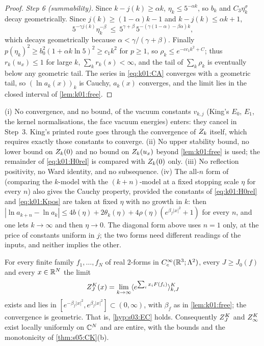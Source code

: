 \begin{proof}
\emph{Step 6 (summability).} Since $k-j(k)\ge\alpha k$, $\eta_k\le5^{-\alpha k}$, so $b_k$ and $C_3\eta_k^\sigma$ decay geometrically. Since $j(k)\ge(1-\alpha)k-1$ and $k-j(k)\le\alpha k+1$,
\[
5^{-\gamma j(k)}\eta_k^{-\beta}\ \le\ 5^{\gamma+\beta}\,5^{-(\gamma(1-\alpha)-\beta\alpha)k},
\]
which decays geometrically because $\alpha<\gamma/(\gamma+\beta)$. Finally $p(\eta_k)^2\ge b_0^2(1+\alpha k\ln5)^{2}\ge c_1k^2$ for $p\ge1$, so $\rho_k\le e^{-cc_1k^2+C}$; thus $r_k(u_x)\le1$ for large $k$, $\sum_kr_k(s)<\infty$, and the tail of $\sum_k\rho_k$ is eventually below any geometric tail. The series in \eqref{eq:k01:CA} converges with a geometric tail, so $(\ln a_k(x))_k$ is Cauchy, $a_k(x)$ converges, and the limit lies in the closed interval of \cref{lem:k01:free}.
\end{proof}

\begin{remark}\label{rem:k01:notused}
(i) No convergence, and no bound, of the vacuum constants $v_{k,j}$ (King's $E_0$, $E_1$, the kernel normalisations, the face vacuum energies) enters: they cancel in Step~3. King's printed route \cite[p.~329]{K2} goes through the convergence of $Z_{k}$ itself, which requires exactly those constants to converge. (ii) No upper stability bound, no lower bound on $Z_{k}(0)$ and no bound on $Z_{k}(u_x)$ beyond \cref{lem:k01:free} is used; the remainder of \eqref{eq:k01:H0rel} is compared with $Z_{k}(0)$ only. (iii) No reflection positivity, no Ward identity, and no subsequence. (iv) The all-$n$ form of \cite[(3.13)]{K1} (comparing the $k$-model with the $(k+n)$-model at a fixed stopping scale $\eta$ for every $n$) also gives the Cauchy property, provided the constants of \eqref{eq:k01:H0rel} and \eqref{eq:k01:Kpos} are taken at fixed $\eta$ with no growth in $k$: then $|\ln a_{k+n}-\ln a_k|\le4b(\eta)+2\theta_k(\eta)+4\rho(\eta)(e^{\beta_f|x|^2}+1)$ for every $n$, and one lets $k\to\infty$ and then $\eta\to0$. The diagonal form above uses $n=1$ only, at the price of constants uniform in $j$; the two forms need different readings of the inputs, and neither implies the other.
\end{remark}

\begin{theorem}\label{thm:k01:EC}
For every finite family $f_1,\dots,f_N$ of real $2$-forms in $C^\infty_c(\mathbb R^3;\Lambda^2)$, every $J\ge J_0(f)$ and every $x\in\mathbb R^N$ the limit
\[
Z^{K}_{J}(x)=\lim_{k\to\infty}\langle e^{\sum_ix_iF(f_i)}\rangle^{K}_{k,J}
\]
exists and lies in $[e^{-\beta_f|x|^2},e^{\beta_f|x|^2}]\subset(0,\infty)$, with $\beta_f$ as in \cref{lem:k01:free}; the convergence is geometric. That is, \cref{hyp:s03:EC} holds. Consequently $Z^{K}_{J}$ and $Z^{K}_{\infty}$ exist locally uniformly on $\mathbb C^N$ and are entire, with the bounds and the monotonicity of \cref{thm:s05:CK}(b).
\end{theorem}

